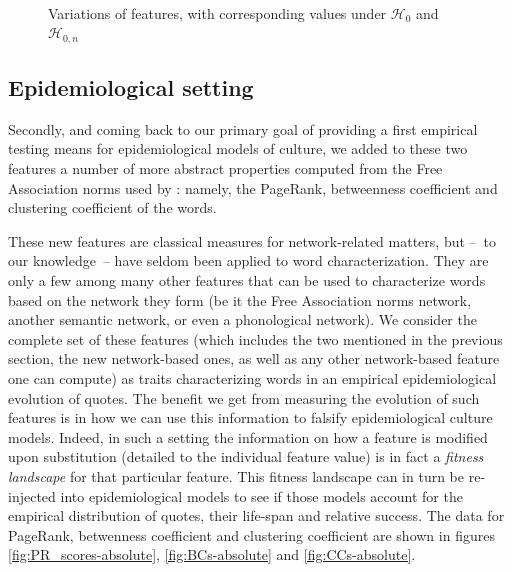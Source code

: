 \begin{figure}[!th]
	\centering
	~
	\caption{Variations of features, with corresponding values under $\mathcal{H}_0$ and $\mathcal{H}_{0,n}$}
\end{figure}


\subsection{Epidemiological setting}

Secondly, and coming back to our primary goal of providing a first empirical testing means for epidemiological models of culture, we added to these two features a number of more abstract properties computed from the Free Association norms used by \citet{Griffiths07}: namely, the PageRank, betweenness coefficient and clustering coefficient of the words.


These new features are classical measures for network-related matters, but --~to our knowledge~-- have seldom been applied to word characterization. They are only a few among many other features that can be used to characterize words based on the network they form (be it the Free Association norms network, another semantic network, or even a phonological network). We consider the complete set of these features (which includes the two mentioned in the previous section, the new network-based ones, as well as any other network-based feature one can compute) as traits characterizing words in an empirical epidemiological evolution of quotes. The benefit we get from measuring the evolution of such features is in how we can use this information to falsify epidemiological culture models. Indeed, in such a setting the information on how a feature is modified upon substitution (detailed to the individual feature value) is in fact a \emph{fitness landscape} for that particular feature. This fitness landscape can in turn be re-injected into epidemiological models to see if those models account for the empirical distribution of quotes, their life-span and relative success. The data for PageRank, betwenness coefficient and clustering coefficient are shown in figures \ref{fig:PR_scores-absolute}, \ref{fig:BCs-absolute} and \ref{fig:CCs-absolute}.

